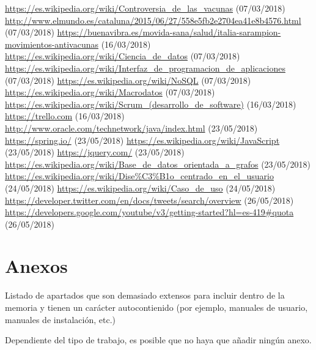 \documentclass[11pt,a4paper]{article}
\begin{document}
\begin{thebibliography}{0}
   \url{https://es.wikipedia.org/wiki/Controversia_de_las_vacunas} (07/03/2018)
   \url{http://www.elmundo.es/cataluna/2015/06/27/558e5fb2e2704ea41e8b4576.html} (07/03/2018)
   \url{https://buenavibra.es/movida-sana/salud/italia-sarampion-movimientos-antivacunas} (16/03/2018)
   \url{https://es.wikipedia.org/wiki/Ciencia_de_datos} (07/03/2018)
   \url{https://es.wikipedia.org/wiki/Interfaz_de_programacion_de_aplicaciones} (07/03/2018)
   \url{https://es.wikipedia.org/wiki/NoSQL} (07/03/2018)
   \url{https://es.wikipedia.org/wiki/Macrodatos} (07/03/2018)
   \url{https://es.wikipedia.org/wiki/Scrum_(desarrollo_de_software)} (16/03/2018)
   \url{https://trello.com} (16/03/2018)
   \url{http://www.oracle.com/technetwork/java/index.html} (23/05/2018)
   \url{https://spring.io/} (23/05/2018)
   \url{https://es.wikipedia.org/wiki/JavaScript} (23/05/2018)
   \url{https://jquery.com/} (23/05/2018)
   \url{https://es.wikipedia.org/wiki/Base_de_datos_orientada_a_grafos} (23/05/2018)
   \url{https://es.wikipedia.org/wiki/Dise%C3%B1o_centrado_en_el_usuario} (24/05/2018)
   \url{https://es.wikipedia.org/wiki/Caso_de_uso} (24/05/2018) 
   \url{https://developer.twitter.com/en/docs/tweets/search/overview} (26/05/2018) 
   \url{https://developers.google.com/youtube/v3/getting-started?hl=es-419#quota} (26/05/2018) 
\end{thebibliography}
\newpage 


\section{Anexos}
\bigskip

Listado de apartados que son demasiado extensos para incluir dentro de la memoria y tienen un carácter autocontienido (por ejemplo, manuales de usuario, manuales de instalación, etc.) 

Dependiente del tipo de trabajo, es posible que no haya que añadir ningún anexo.
\end{document}
